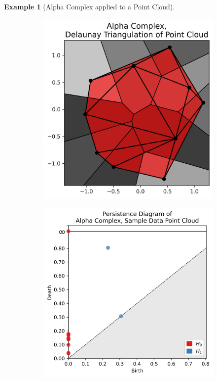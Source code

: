 \documentclass[ma]{uncgdissertationexp}
\theoremstyle{plain}
\theoremstyle{definition}
\newtheorem{example}[theorem]{Example}
\theoremstyle{remark}
\begin{document}
\begin{example}[Alpha Complex applied to a Point Cloud]
\begin{figure}[H]
\begin{subfigure}[b]{0.27\textwidth}
    \end{subfigure}
    \begin{subfigure}[b]{0.27\textwidth}
        \includegraphics[width=\textwidth]{point_cloud_plot_alpha_voronoi.png}
    \end{subfigure}
    \begin{subfigure}[b]{0.26\textwidth}
        \includegraphics[width=\textwidth]{point_cloud_persdia_alpha_voronoi.png}
    \end{subfigure}


\end{figure}
\end{example}
\end{document}
